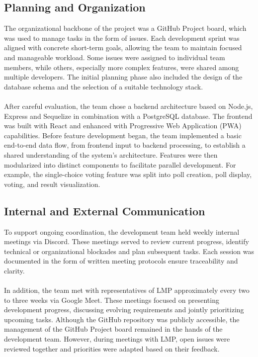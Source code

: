 \documentclass[a4paper,12pt]{report}
\begin{document}
\subsection{Planning and Organization}
The organizational backbone of the project was a GitHub Project board, which was used to manage tasks in the form of issues. Each development sprint was aligned with concrete short-term goals, allowing the team to maintain focused and manageable workload. Some issues were assigned to individual team members, while others, especially more complex features, were shared among multiple developers. The initial planning phase also included the design of the database schema and the selection of a suitable technology stack.\\\\
After careful evaluation, the team chose a backend architecture based on Node.js, Express and Sequelize in combination with a PostgreSQL database. The frontend was built with React and enhanced with Progressive Web Application (PWA) capabilities. Before feature development began, the team implemented a basic end-to-end data flow, from frontend input to backend processing, to establish a shared understanding of the system's architecture. Features were then modularized into distinct components to facilitate parallel development. For example, the single-choice voting feature was split into poll creation, poll display, voting, and result visualization. \\

\subsection{Internal and External Communication}
To support ongoing coordination, the development team held weekly internal meetings via Discord. These meetings served to review current progress, identify technical or organizational blockades and plan subsequent tasks. Each session was documented in the form of written meeting protocols ensure traceability and clarity.\\\\
In addition, the team met with representatives of LMP approximately every two to three weeks via Google Meet. These meetings focused on presenting development progress, discussing evolving requirements and jointly prioritizing upcoming tasks. Although the GitHub repository was publicly accessible, the management of the GitHub Project board remained in the hands of the development team. However, during meetings with LMP, open issues were reviewed together and priorities were adapted based on their feedback. \\
\end{document}
